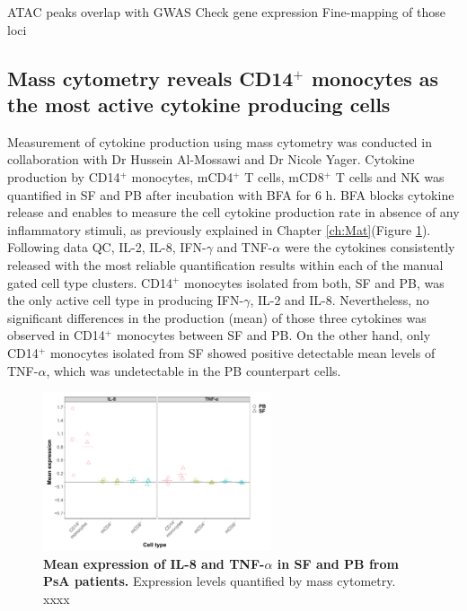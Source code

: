 ATAC peaks overlap with GWAS
Check gene expression
Fine-mapping of those loci


\subsection{Mass cytometry reveals CD14$^+$ monocytes as the most active cytokine producing cells}
Measurement of cytokine production using mass cytometry was conducted in collaboration with Dr Hussein Al-Mossawi and Dr Nicole Yager. Cytokine production by CD14$^+$ monocytes, mCD4$^+$ T cells, mCD8$^+$ T cells and NK was quantified in SF and PB after incubation with BFA for 6 h. BFA blocks cytokine release and enables to measure the cell cytokine production rate in absence of any inflammatory stimuli, as previously explained in Chapter \ref{ch:Mat}(Figure \ref{figure:PSA_cytof_cytokines}). Following data QC, IL-2, IL-8, IFN-$\gamma$ and TNF-$\alpha$ were the cytokines consistently released with the most reliable quantification results within each of the manual gated cell type clusters. CD14$^+$ monocytes isolated from both, SF and PB, was the only active cell type in producing IFN-$\gamma$, IL-2 and IL-8. Nevertheless, no significant differences in the production (mean) of those three cytokines was observed in CD14$^+$ monocytes between SF and PB. On the other hand, only CD14$^+$ monocytes isolated from SF showed positive detectable mean levels of TNF-$\alpha$, which was undetectable in the PB counterpart cells. 

\begin{figure}[htbp]
\centering
\includegraphics[width=0.6\textwidth]{./Results3/pdfs/CyTOF_ICS_cytokines_production_IL8_TNF}
\caption[Mean expression of IL-8 and TNF-$\alpha$ in SF and PB from PsA patients.]{\textbf{Mean expression of IL-8 and TNF-$\alpha$ in SF and PB from PsA patients.} Expression levels quantified by mass cytometry. xxxx }
\label{figure:PSA_cytof_cytokines}
\end{figure}



